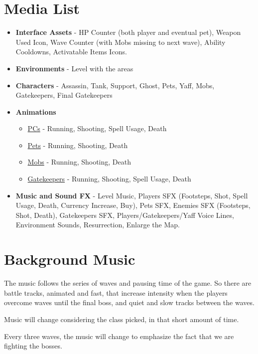 \documentclass[12pt]{article}
\begin{document}
\newpage

\section{Media List}

\begin{itemize}
	\item \textbf{Interface Assets} - HP Counter (both player and eventual pet), Weapon Used Icon, Wave Counter (with Mobs missing to next wave), Ability Cooldowns, Activatable Items Icons.
	\item \textbf{Environments} - Level with the areas
	\item \textbf{Characters} - Assassin, Tank, Support, Ghost, Pets, Yaff, Mobs, Gatekeepers, Final Gatekeepers
	\item \textbf{Animations}
	\begin{itemize}
		\item \underline{PCs} - Running, Shooting, Spell Usage, Death
		\item \underline{Pets} - Running, Shooting, Death
		\item \underline{Mobs} - Running, Shooting, Death
		\item \underline{Gatekeepers} - Running, Shooting, Spell Usage, Death
	\end{itemize}
	\item \textbf{Music and Sound FX} - Level Music, Players SFX (Footsteps, Shot, Spell Usage, Death, Currency Increase, Buy), Pets SFX, Enemies SFX (Footsteps, Shot, Death), Gatekeepers SFX, Players/Gatekeepers/Yaff Voice Lines, Environment Sounds, Resurrection, Enlarge the Map.
\end{itemize}

\newpage

\section{Background Music}

The music follows the series of waves and pausing time of the game. So there are battle tracks, animated and fast, that increase intensity when the players overcome waves until the final boss, and quiet and slow tracks between the waves.

Music will change considering the class picked, in that short amount of time.

Every three waves, the music will change to emphasize the fact that we are fighting the bosses.
\end{document}
